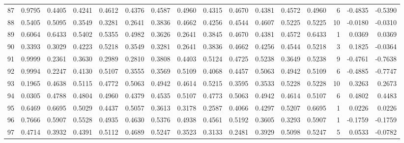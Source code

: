 \begin{tabular}{lrrrrrrrrrrrrrrr}
87  &      0.9795 &  0.4405 &  0.4241 &  0.4612 &  0.4376 &  0.4587 &  0.4960 &  0.4315 &  0.4670 &  0.4381 &   0.4572 &     0.4960 &      6 &                   -0.4835 &                    -0.5390 \\
88  &      0.5405 &  0.5095 &  0.3549 &  0.3281 &  0.2641 &  0.3836 &  0.4662 &  0.4256 &  0.4544 &  0.4607 &   0.5225 &     0.5225 &     10 &                   -0.0180 &                    -0.0310 \\
89  &      0.6064 &  0.6433 &  0.5402 &  0.5355 &  0.4982 &  0.3626 &  0.2641 &  0.3845 &  0.4670 &  0.4381 &   0.4572 &     0.6433 &      1 &                    0.0369 &                     0.0369 \\
90  &      0.3393 &  0.3029 &  0.4223 &  0.5218 &  0.3549 &  0.3281 &  0.2641 &  0.3836 &  0.4662 &  0.4256 &   0.4544 &     0.5218 &      3 &                    0.1825 &                    -0.0364 \\
91  &      0.9999 &  0.2361 &  0.3630 &  0.2989 &  0.2810 &  0.3808 &  0.4403 &  0.5124 &  0.4725 &  0.5238 &   0.3649 &     0.5238 &      9 &                   -0.4761 &                    -0.7638 \\
92  &      0.9994 &  0.2247 &  0.4130 &  0.5107 &  0.3555 &  0.3569 &  0.5109 &  0.4068 &  0.4457 &  0.5063 &   0.4942 &     0.5109 &      6 &                   -0.4885 &                    -0.7747 \\
93  &      0.1965 &  0.4638 &  0.5115 &  0.4772 &  0.5063 &  0.4942 &  0.4614 &  0.5215 &  0.3595 &  0.3533 &   0.5228 &     0.5228 &     10 &                    0.3263 &                     0.2673 \\
94  &      0.0305 &  0.4788 &  0.4804 &  0.4960 &  0.4379 &  0.4535 &  0.5107 &  0.4773 &  0.5063 &  0.4942 &   0.4614 &     0.5107 &      6 &                    0.4802 &                     0.4483 \\
95  &      0.6469 &  0.6695 &  0.5029 &  0.4437 &  0.5057 &  0.3613 &  0.3178 &  0.2587 &  0.4066 &  0.4297 &   0.5207 &     0.6695 &      1 &                    0.0226 &                     0.0226 \\
96  &      0.7666 &  0.5907 &  0.5528 &  0.4935 &  0.4630 &  0.5376 &  0.4938 &  0.4561 &  0.5192 &  0.3605 &   0.3293 &     0.5907 &      1 &                   -0.1759 &                    -0.1759 \\
97  &      0.4714 &  0.3932 &  0.4391 &  0.5112 &  0.4689 &  0.5247 &  0.3523 &  0.3133 &  0.2481 &  0.3929 &   0.5098 &     0.5247 &      5 &                    0.0533 &                    -0.0782 \\

\end{tabular}
